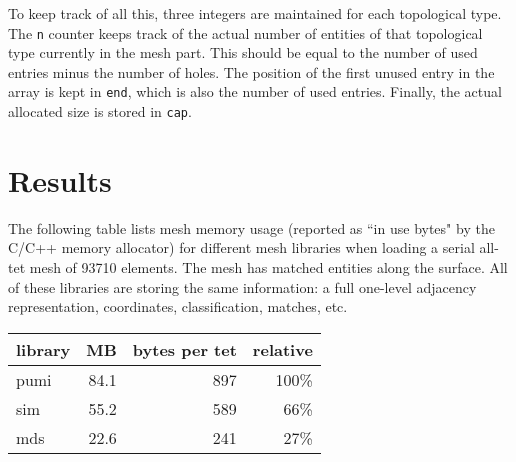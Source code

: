 \documentclass{article}
\begin{document}
To keep track of all this, three integers are maintained for
each topological type.
The \texttt{n} counter keeps track of the actual number of entities
of that topological type currently in the mesh part.
This should be equal to the number of used entries minus the number
of holes.
The position of the first unused entry in the array is kept in
\texttt{end}, which is also the number of used entries.
Finally, the actual allocated size is stored in \texttt{cap}.

\section{Results}

The following table lists mesh memory usage (reported as ``in use bytes"
by the C/C++ memory allocator) for different mesh libraries
when loading a serial all-tet mesh of 93710 elements.
The mesh has matched entities along the surface.
All of these libraries are storing the same information:
a full one-level adjacency representation, coordinates,
classification, matches, etc.

\begin{center}
\begin{tabular}{lrrr}
library & MB & bytes per tet & relative \\\hline
pumi & 84.1 & 897 & 100\% \\
sim  & 55.2 & 589 &  66\% \\
mds  & 22.6 & 241 &  27\% \\
\end{tabular}
\end{center}

{}

\end{document}
